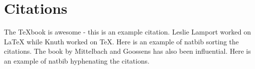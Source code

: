 \documentclass{article}
\begin{document}
\cleardoublepage

\section{Citations}
The TeXbook is awesome\cite{Knuth84} - this is an example citation.  Leslie Lamport worked on LaTeX
while Knuth worked on TeX.  Here is an example of natbib sorting the citations\cite{Lamp86,Knuth84}.
The book by Mittelbach and Goossens\cite{Mitt04} has also been influential.
Here is an example of natbib hyphenating the citations\cite{Knuth84,Lamp86,Mitt04}.

\cleardoublepage



\end{document}
